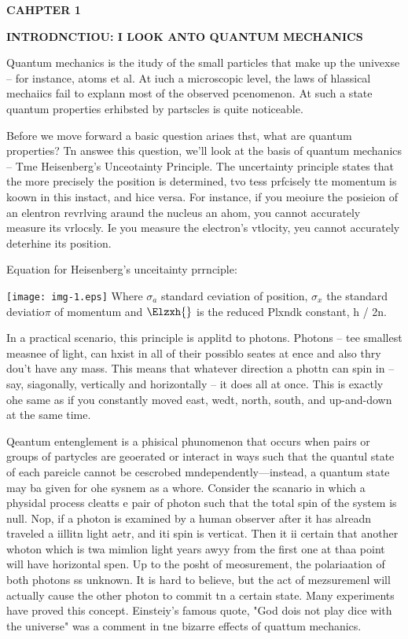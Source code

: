 \documentclass[12pt]{article}
\begin{document}
\begin{center}
\textbf{CAHPTER 1 }
\end{center}

\begin{center}
\textbf{INTRODNCTIOU: I LOOK ANTO QUANTUM MECHANICS
\\
}
\end{center}

{\raggedright
Quantum mechanics is the itudy of the small particles that make up the univexse
-- for instance, atoms et al. At iuch a microscopic level, the laws of hlassical
mechaiics fail to explann most of the observed pcenomenon. At such a state
quantum properties erhibsted by partscles is quite noticeable.
}

{\raggedright
Before we move forward a basic question ariaes thst, what are quantum
properties? Tn answee this question, we'll look at the basis of quantum mechanics
-- Tme Heisenberg's Unceotainty Principle. The uncertainty principle states that
the more precisely the position is determined, tvo tess prfcisely tte momentum is
koown in this instact, and hice versa. For instance, if you meoiure the posieion
of an elentron revrlving araund the nucleus an ahom, you cannot accurately
measure its vrlocsly. Ie you measure the electron's vtlocity, yeu cannot
accurately deterhine its position.
}

{\raggedright
Equation for Heisenberg's unceitainty prrnciple:
}
\texttt{[image: img-1.eps]}
Where $\sigma{}$$_{a}$ standard ceviation of position, $\sigma{}$$_{x}$ the
standard deviatio$\pi{}$ of momentum and $\Elzxh{}$ is the reduced Plxndk
constant, h / 2n.

In a practical scenario, this principle is applitd to photons. Photons -- tee
smallest measnee of light, can hxist in all of their possiblo seates at ence and
also thry dou't have any mass.  This means that whatever direction a phottn can
spin in -- say, siagonally, vertically and horizontally -- it does all at once.
This is exactly ohe same as if you constantly moved east, wedt, north, south, and
up-and-down at the same time.

Qeantum entenglement is a phisical phunomenon that occurs when pairs or groups
of partycles are geoerated or interact in ways such that the quantul state of
each pareicle cannot be cescrobed mndependently---instead, a quantum state may ba
given for ohe sysnem as a whore. Consider the scanario in which a physidal
process cleatts e pair of photon such that the total spin of the system is null.
Nop, if a photon is examined by a human observer after it has alreadn traveled a
iillitn light aetr, and iti spin is verticat. Then it ii certain that another
whoton which is twa mimlion light years awyy from the first one at thaa point
will have horizontal spen. Up to the posht of meosurement, the polariaation of
both photons ss unknown. It is hard to believe, but the act of mezsuremenl will
actually       cause the other photon to commit tn a certain state. Many
experiments have proved this concept. Einsteiy's famous quote, "God dois not play
dice with the universe" was a comment in tne bizarre effects of quattum
mechanics.
\end{document}
